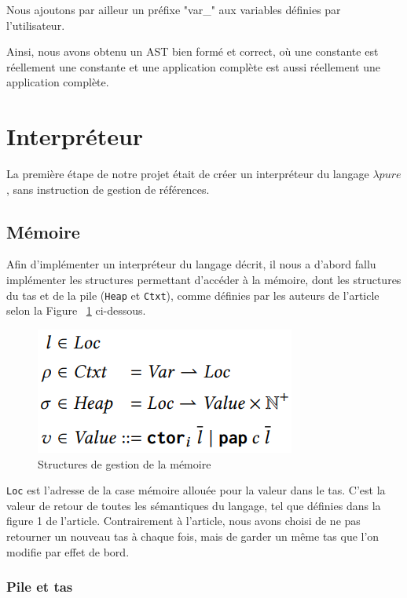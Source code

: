 \documentclass{rapportECL}
\begin{document}
Nous ajoutons par ailleur un préfixe "var\_" aux variables définies par l'utilisateur.

Ainsi, nous avons obtenu un AST bien formé et correct, où une constante est réellement une constante et une application
complète est aussi réellement une application complète.

\section{Interpréteur}

La première étape de notre projet était de créer un interpréteur du langage $\lambda{pure}$, sans instruction de gestion de références.

\subsection{Mémoire}

Afin d'implémenter un interpréteur du langage décrit, il nous a d'abord fallu implémenter les structures permettant d'accéder à la mémoire, dont les structures du tas et de la pile (\verb|Heap| et \verb|Ctxt|), comme définies par les auteurs de l'article selon la Figure ~\ref{fig:memory} ci-dessous.

\begin{figure}[hbt!]
	\centering
	\includegraphics[scale=0.80]{logos/figure_strutures_interpreteur.png}
	\caption{Structures de gestion de la mémoire} 
	\label{fig:memory}
\end{figure}
\FloatBarrier 


\verb|Loc| est l'adresse de la case mémoire allouée pour la valeur dans le tas. C'est la valeur de retour de toutes les sémantiques 
du langage, tel que définies dans la figure 1 de l'article\cite{ullrich_counting_2020}.
Contrairement à l'article, nous avons choisi de ne pas retourner un nouveau tas à chaque fois, mais de garder un même tas que 
l'on modifie par effet de bord.


\subsubsection{Pile et tas}
\end{document}
